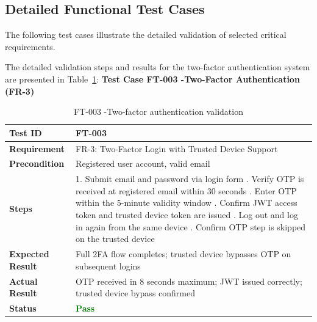 \subsection{Detailed Functional Test Cases}

The following test cases illustrate the detailed validation of selected critical requirements.



The detailed validation steps and results for the two-factor authentication system are presented in Table~\ref{tab:ft003}:
\textbf{Test Case FT-003 -Two-Factor Authentication (FR-3)}
\begin{table}[H]
\caption{FT-003 -Two-factor authentication validation}
\centering
\begin{tabular}{|l|p{10cm}|}
\hline
\textbf{Test ID} & FT-003 \\
\hline
\textbf{Requirement} & FR-3: Two-Factor Login with Trusted Device Support \\
\hline
\textbf{Precondition} & Registered user account, valid email \\
\hline
\textbf{Steps} &
1. Submit email and password via login form \newline
2. Verify OTP is received at registered email within 30 seconds \newline
3. Enter OTP within the 5-minute validity window \newline
4. Confirm JWT access token and trusted device token are issued \newline
5. Log out and log in again from the same device \newline
6. Confirm OTP step is skipped on the trusted device \\
\hline
\textbf{Expected Result} & Full 2FA flow completes; trusted device bypasses OTP on subsequent logins \\
\hline
\textbf{Actual Result} & OTP received in 8 seconds maximum; JWT issued correctly; trusted device bypass confirmed \\
\hline
\textbf{Status} & \textcolor{green}{\textbf{Pass}} \\
\hline
\end{tabular}

\label{tab:ft003}
\end{table}

